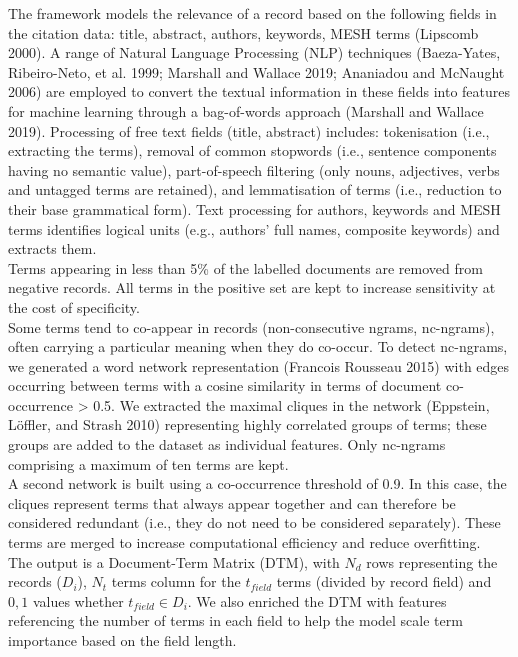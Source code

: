 \documentclass{article}
\begin{document}
The framework models the relevance of a record based on the following
fields in the citation data: title, abstract, authors, keywords, MESH
terms (Lipscomb 2000). A range of Natural Language Processing (NLP)
techniques (Baeza-Yates, Ribeiro-Neto, et al. 1999; Marshall and Wallace
2019; Ananiadou and McNaught 2006) are employed to convert the textual
information in these fields into features for machine learning through a
bag-of-words approach (Marshall and Wallace 2019). Processing of free
text fields (title, abstract) includes: tokenisation (i.e., extracting
the terms), removal of common stopwords (i.e., sentence components
having no semantic value), part-of-speech filtering (only nouns,
adjectives, verbs and untagged terms are retained), and lemmatisation of
terms (i.e., reduction to their base grammatical form). Text processing
for authors, keywords and MESH terms identifies logical units (e.g.,
authors' full names, composite keywords) and extracts them.\\
Terms appearing in less than 5\% of the labelled documents are removed
from negative records. All terms in the positive set are kept to
increase sensitivity at the cost of specificity.\\
Some terms tend to co-appear in records (non-consecutive ngrams,
nc-ngrams), often carrying a particular meaning when they do co-occur.
To detect nc-ngrams, we generated a word network representation
(Francois Rousseau 2015) with edges occurring between terms with a
cosine similarity in terms of document co-occurrence \textgreater{} 0.5.
We extracted the maximal cliques in the network (Eppstein, Löffler, and
Strash 2010) representing highly correlated groups of terms; these
groups are added to the dataset as individual features. Only nc-ngrams
comprising a maximum of ten terms are kept.\\
A second network is built using a co-occurrence threshold of 0.9. In
this case, the cliques represent terms that always appear together and
can therefore be considered redundant (i.e., they do not need to be
considered separately). These terms are merged to increase computational
efficiency and reduce overfitting.\\
The output is a Document-Term Matrix (DTM), with \(N_d\) rows
representing the records (\(D_i\)), \(N_t\) terms column for the
\(t_{field}\) terms (divided by record field) and \({0,1}\) values
whether \(t_{field} \in D_i\). We also enriched the DTM with features
referencing the number of terms in each field to help the model scale
term importance based on the field length.
\end{document}
